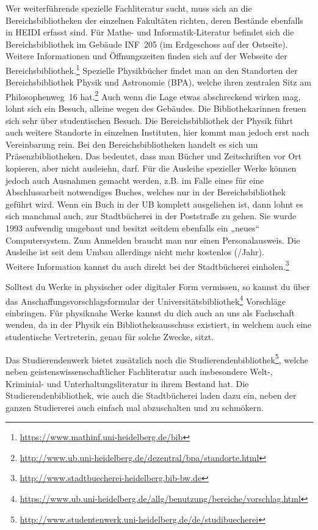 Wer weiterführende spezielle Fachliteratur sucht, muss sich an die Bereichsbibliotheken der einzelnen Fakultäten richten, deren Bestände ebenfalls in \gls{HEIDI} erfasst sind. Für Mathe- und Informatik-Literatur befindet sich die Bereichsbibliothek im Gebäude \gls{INF}~205 (im Erdgeschoss auf der Ostseite). Weitere Informationen und Öffnungszeiten finden sich auf der Webseite der Bereichsbibliothek.\footnote{\url{https://www.mathinf.uni-heidelberg.de/bib}} Spezielle Physikbücher findet man an den Standorten der Bereichsbibliothek Physik und Astronomie (BPA), welche ihren zentralen Sitz am Philosophenweg~16 hat.\footnote{\url{http://www.ub.uni-heidelberg.de/dezentral/bpa/standorte.html}} Auch wenn die Lage etwas abschreckend wirken mag, lohnt sich ein Besuch, alleine wegen des Gebäudes. Die Bibliothekarinnen freuen sich sehr über studentischen Besuch. Die Bereichsbibliothek der Physik führt auch weitere Standorte in einzelnen Instituten, hier kommt man jedoch erst nach Vereinbarung rein.
Bei den Bereichsbibliotheken handelt es sich um Präsenzbibliotheken. Das bedeutet, dass man Bücher und Zeitschriften vor Ort kopieren, aber nicht ausleiehn, darf. Für die Ausleihe spezieller Werke können jedoch auch Ausnahmen gemacht werden, z.B. im Falle eines für eine Abschlussarbeit notwendiges Buches, welches nur in der Bereichsbibliothek geführt wird.
Wenn ein Buch in der UB komplett ausgeliehen ist, dann lohnt es sich manchmal auch, zur Stadtbücherei in der Poststraße zu gehen. Sie wurde 1993 aufwendig umgebaut und besitzt seitdem ebenfalls ein „neues“ Computersystem. Zum Anmelden braucht man nur einen Personalausweis. Die Ausleihe ist seit dem Umbau allerdings nicht mehr kostenlos (/Jahr).\\ Weitere Information kannst du auch direkt bei der Stadtbücherei einholen.\footnote{\url{http://www.stadtbuecherei-heidelberg.bib-bw.de}}

Solltest du Werke in physischer oder digitaler Form vermissen, so kannst du über das Anschaffungsvorschlagsformular der Universitätsbibliothek\footnote{\url{https://www.ub.uni-heidelberg.de/allg/benutzung/bereiche/vorschlag.html}} Vorschläge einbringen. Für physiknahe Werke kannst du dich auch an uns als Fachschaft wenden, da in der Physik ein Bibliotheksausschuss existiert, in welchem auch eine studentische Vertreterin, genau für solche Zwecke, sitzt.
 
Das Studierendenwerk bietet zusätzlich noch die Studierendenbibliothek\footnote{\url{http://www.studentenwerk.uni-heidelberg.de/de/studibuecherei}}, welche neben geistenswissenschaftlicher Fachliteratur auch insbesondere Welt-, Kriminial- und Unterhaltungsliteratur in ihrem Bestand hat. Die Studierendenbibliothek, wie auch die Stadtbücherei laden dazu ein, neben der ganzen Studiererei auch einfach mal abzuschalten und zu schmökern.

